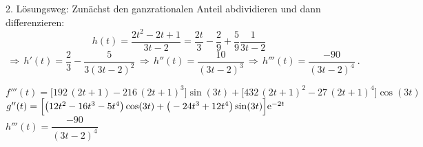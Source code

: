 {2. Lösungsweg: Zun\"achst den ganzrationalen Anteil abdividieren und dann differenzieren:
	\[
	h(t)=\dfrac{2t^2-2t+1}{3t-2} = \dfrac{2t}{3} - \dfrac{2}{9}+\dfrac 59\dfrac{1}{3t-2}
\]
	\[
	\,\Rightarrow\, h'(t)=\dfrac 23-\dfrac{5}{3(3t-2)^2} \,\Rightarrow\, h''(t)=\dfrac{10}{(3t-2)^3} \,\Rightarrow\, h'''(t)=\dfrac{-90}{(3t-2)^4}\ .
\]

}
{
$f'''(t)= \Big[192\,(2t+1)-216\,(2t+1)^3\Big]\sin(3t)+\Big[432\,(2t+1)^2-27\,(2t+1)^4\Big]\cos(3t)$\\
$g''(t) = \Big[\big(12t^2-16t^3-5t^4\big)\cos(3t)+\big(-24t^3+12t^4\big)\sin(3t)\Big]\mathrm{e}^{-2t}$\\
$h'''(t)= \dfrac{-90}{(3t-2)^4}$
}
